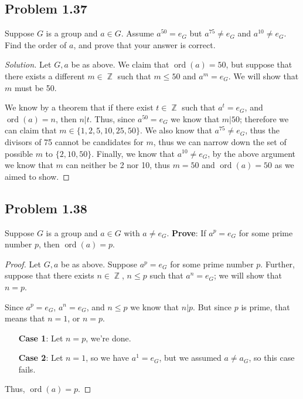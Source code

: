 \documentclass{amsbook}
\DeclareMathOperator{\ord}{\text{ord}}
\DeclareMathOperator{\Z}{\mathbb{Z}}
\begin{document}
			\subsection*{Problem 1.37}
			\label{sub:problem_1_37}
			Suppose $G$ is a group and $a \in G$. 
			Assume $a^{50} = e_{G}$ but $a^{75} \neq e_{G}$ and $a^{10} \neq e_{G}$. 
			Find the order of $a$, and prove that your answer is correct.
			\begin{proof}[Solution] Let $G,a$ be as above.
			We claim that $\ord(a) = 50$, but suppose that there exists a different $m \in \Z$ such that $m \leq 50$ and $a^{m} = e_{G}$.
			We will show that $m$ must be 50.

			We know by a theorem that if there exist $t \in \Z$ such that $a^{t} = e_{G}$, and $\ord(a) = n$, then $n|t$.
			Thus, since $a^{50} = e_{G}$ we know that $m|50$; therefore we can claim that $m \in \{ 1,2,5,10,25,50 \}$.
			We also know that $a^{75} \neq e_{G}$, thus the divisors of 75 cannot be candidates for $m$, thus we can narrow down the set of possible $m$ to $\{ 2,10,50 \}$.
			Finally, we know that $a^{10} \neq e_{G}$, by the above argument we know that $m$ can neither be 2 nor 10, thus $m = 50$ and $\ord(a) = 50$ as we aimed to show.
			\end{proof}

			\subsection*{Problem 1.38}
			\label{sub:problem_1_38}
			Suppose $G$ is a group and $a \in G$ with $a \neq e_{G}$.
			\textbf{Prove}: If $a^{p}=e_{G}$ for some prime number $p$, then $\ord(a) = p$.
			\begin{proof}
			Let $G,a$ be as above.
			Suppose $a^{p} = e_{G}$ for some prime number $p$.
			Further, suppose that there exists $n \in \Z$, $n \leq p$ such that $a^{n} = e_{G}$; we will show that $n = p$.

			Since $a^{p} = e_{G}$, $a^{n} = e_{G}$, and $n \leq p$ we know that $n|p$.
			But since $p$ is prime, that means that $n=1$, or $n = p$.
			\begin{enumerate}
				\item[\textbf{Case 1}:] Let $n = p$, we're done.
				\item[\textbf{Case 2}:] Let $n = 1$, so we have $a^{1} = e_{G}$, but we assumed $a \neq a_{G}$, so this case fails.
			\end{enumerate}
			Thus, $\ord(a) = p$.		
			\end{proof}
\end{document}
